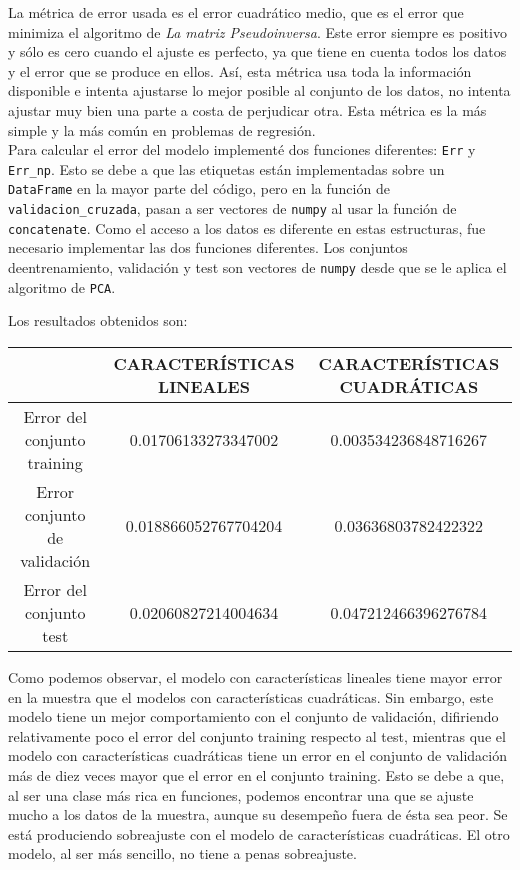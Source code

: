 \documentclass{article}
\begin{document}
La métrica de error usada es el error cuadrático medio, que es el error que minimiza el algoritmo de \textit{La matriz Pseudoinversa}. Este error siempre es positivo y sólo es cero cuando el ajuste es perfecto, ya que tiene en cuenta todos los datos y el error que se produce en ellos. Así, esta métrica usa toda la información disponible e intenta ajustarse lo mejor posible al conjunto de los datos, no intenta ajustar muy bien una parte a costa de perjudicar otra. Esta métrica es la más simple y la más común en problemas de regresión.\\

Para calcular el error del modelo implementé dos funciones diferentes: \texttt{Err} y \texttt{Err\_np}. Esto se debe a que las etiquetas están implementadas sobre un \texttt{DataFrame} en la mayor parte del código, pero en la función de \texttt{validacion\_cruzada}, pasan a ser vectores de \texttt{numpy} al usar la función de \texttt{concatenate}. Como el acceso a los datos es diferente en estas estructuras, fue necesario implementar las dos funciones diferentes. Los conjuntos deentrenamiento, validación y test son vectores de \texttt{numpy} desde que se le aplica el algoritmo de \texttt{PCA}.

Los resultados obtenidos son:

\begin{center}
\begin{tabular}{|c|c|c|}
\hline
\multicolumn{1}{|c|}{}& \textbf{CARACTERÍSTICAS LINEALES} &
\textbf{CARACTERÍSTICAS CUADRÁTICAS}  \\ \hline
  Error del conjunto training       & 0.01706133273347002  & 0.003534236848716267 \\
  Error conjunto de validación      & 0.018866052767704204 & 0.03636803782422322 \\
  Error del conjunto test           & 0.02060827214004634  & 0.047212466396276784 \\ \hline
\end{tabular}
\end{center}

Como podemos observar, el modelo con características lineales tiene mayor error en la muestra que el modelos con características cuadráticas. Sin embargo, este modelo tiene un mejor comportamiento con el conjunto de validación, difiriendo relativamente poco el error del conjunto training respecto al test, mientras que el modelo con características cuadráticas tiene un error en el conjunto de validación más de diez veces mayor que el error en el conjunto training. Esto se debe a que, al ser una clase más rica en funciones, podemos encontrar una que se ajuste mucho a los datos de la muestra, aunque su desempeño fuera de ésta sea peor. Se está produciendo sobreajuste con el modelo de características cuadráticas. El otro modelo, al ser más sencillo, no tiene a penas sobreajuste.\\
\end{document}
